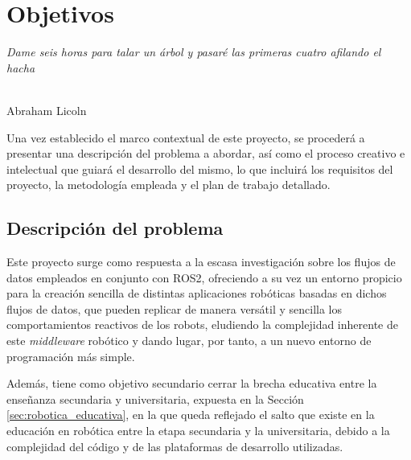 \chapter{Objetivos}
\label{cap:capitulo2}

\begin{flushright}
\begin{minipage}[]{10cm}
\emph{Dame seis horas para talar un árbol y pasaré las primeras cuatro afilando el hacha}\\
\end{minipage}\\

Abraham Licoln\\
\end{flushright}

\vspace{1cm}

Una vez establecido el marco contextual de este proyecto, se procederá a
presentar una descripción del problema a abordar, así como el proceso creativo e
intelectual que guiará el desarrollo del mismo, lo que incluirá los requisitos
del proyecto, la metodología empleada y el plan de trabajo detallado.


\section{Descripción del problema}
\label{sec:descripcion}

Este proyecto surge como respuesta a la escasa investigación sobre los flujos de
datos empleados en conjunto con ROS2, ofreciendo a su vez un entorno propicio
para la creación sencilla de distintas aplicaciones robóticas basadas en dichos
flujos de datos, que pueden replicar de manera versátil y sencilla los
comportamientos reactivos de los robots, eludiendo la complejidad inherente de
este \textit{middleware} robótico y dando lugar, por tanto, a un nuevo entorno
de programación más simple.

Además, tiene como objetivo secundario cerrar la brecha educativa entre la
enseñanza secundaria y universitaria, expuesta en la Sección
\ref{sec:robotica_educativa}, en la que queda reflejado el salto que existe en
la educación en robótica entre la etapa secundaria y la universitaria, debido a
la complejidad del código y de las plataformas de desarrollo utilizadas.

